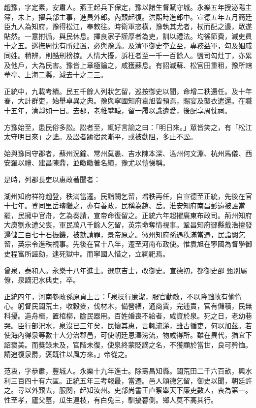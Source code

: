 \begin{pinyinscope}
趙豫，字定素，安肅人。燕王起兵下保定，豫以諸生督賦守城。永樂五年授泌陽主簿，未上，擢兵部主事，進員外郎。內艱起復。洪熙時進郎中。宣德五年五月簡廷臣九人為知府，豫得松江，奉敕往。時衛軍恣橫，豫執其尤者，杖而配之邊，眾遂貼然。一意拊循，與民休息。擇良家子謹厚者為吏，訓以禮法。均徭節費，減吏員十之五。巡撫周忱有所建置，必與豫議。及清軍御史李立至，專務益軍，勾及姻戚同姓。稍辨，則酷刑榜掠。人情大擾，訴枉者至一千一百餘人。鹽司勾灶丁，亦累及他戶，大為民害。豫皆上章極論之，咸獲蘇息。有詔滅蘇、松官田重租，豫所轄華亭、上海二縣，減去十之二三。

正統中，九載考績。民五千餘人列狀乞留，巡按御史以聞，命增二秩還任。及十年春，大計群吏，始舉卓異之典。豫與寧國知府袁旭皆預焉，賜宴及襲衣遣還。在職十五年，清靜如一日。去郡，老稚攀轅，留一履以識遺愛，後配享周忱祠。

方豫始至，患民俗多訟。訟者至，輒好言諭之曰：「明日來。」眾皆笑之，有「松江太守明日來」之謠。及訟者踰宿忿漸平，或被勸阻，多止不訟。

始與豫同守郡者，蘇州況鐘、常州莫愚、吉水陳本深、溫州何文淵、杭州馬儀、西安羅以禮、建昌陳鼎，並皦皦著名績，豫尤以愷悌稱。

是時，列郡長吏以惠政著聞者：

湖州知府祥符趙登，秩滿當遷。民詣闕乞留，增秩再任，自宣德至正統，先後在官十七年。登同里岳璿繼之，亦有善政，民稱為趙、岳。淮安知府南昌彭遠被誣當罷，民擁中官舟，乞為奏請，宣帝命復留之。正統六年超擢廣東布政司。荊州知府大庾劉永遭父喪，軍民萬八千餘人乞留，英宗命奪情視事。鞏昌知府鄞縣戴浩擅發邊儲三百七十石振饑，被劾請罪，景帝原之。徽州知府孫遇秩滿當遷，民詣闕乞留，英宗令進秩視事。先後在官十八年，遷至河南布政使。惟袁旭在寧國為督學御史程富所誣劾，逮死獄中。而寧國人惜之，立祠祀焉。

曾泉，泰和人。永樂十八年進士。選庶吉士，改御史。宣德初，都御史邵甄別屬僚，泉謫汜水典史，卒。

正統四年，河南參政孫原貞上言：「泉操行廉潔，服官勤敏，不以降黜故有偷惰心。躬督民闢荒土，收穀麥，伐材木，備營繕，通商賈，完逋責，官有儲積，民無科擾。造舟楫，置棺槨，膽民器用。百姓婚喪不給者，咸資於泉。死之日，老幼巷哭。臣行部汜水，泉沒已三年矣，民懷其惠，言輒流涕，雖古循吏，何以加茲。若使海內得泉等數十人分治郡邑，可使朝廷恩澤滂流，物咸得所。雖在異代，猶宜下詔褒美。而獎錄未及，官階未復，使泉終蒙貶謫之名，不獲顯於當世，良可矜恤。請追復泉爵，褒既往以風方來。」帝從之。

范衷，字恭肅，豐城人。永樂十九年進士。除壽昌知縣。闢荒田二千六百畝，興水利三百四十有六區。正統五年三考報最，當遷。邑人頌德乞留，御史以聞，朝廷許之。尋以外艱去，服闋，起知汝州。吏部尚書王直察舉天下廉吏數人，衷為第一。性至孝，廬父墓，瓜生連枝，有白兔三，馴擾暮側。鄉人莫不高其行。


\end{pinyinscope}
